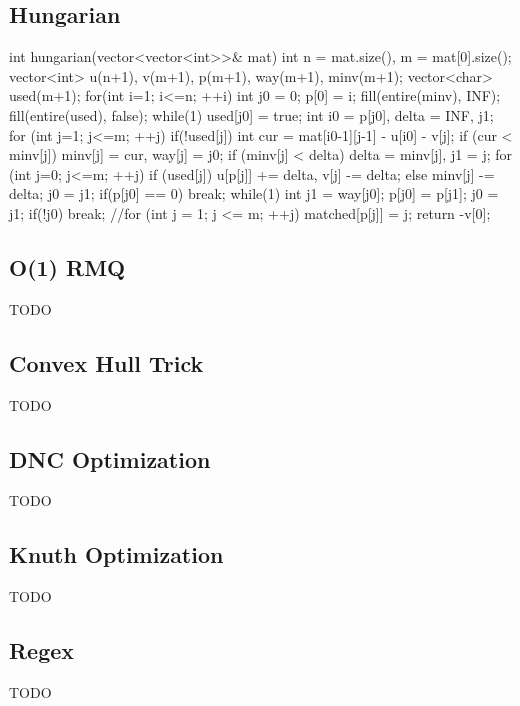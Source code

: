 \subsection{Hungarian}
\begin{cpp}
int hungarian(vector<vector<int>>& mat){
  int n = mat.size(), m = mat[0].size();
  vector<int> u(n+1), v(m+1), p(m+1), way(m+1), minv(m+1);
  vector<char> used(m+1);
  for(int i=1; i<=n; ++i) {
    int j0 = 0; p[0] = i;
    fill(entire(minv), INF);
    fill(entire(used), false);
    while(1){
      used[j0] = true;
      int i0 = p[j0], delta = INF, j1;
      for (int j=1; j<=m; ++j) if(!used[j]) {
        int cur = mat[i0-1][j-1] - u[i0] - v[j];
        if (cur < minv[j]) minv[j] = cur, way[j] = j0;
        if (minv[j] < delta) delta = minv[j], j1 = j;
      }
      for (int j=0; j<=m; ++j) {
        if (used[j]) u[p[j]] += delta, v[j] -= delta;
        else minv[j] -= delta;
      }
      j0 = j1;
      if(p[j0] == 0) break;
    }
    while(1){
      int j1 = way[j0];
      p[j0] = p[j1]; j0 = j1;
      if(!j0) break;
    }
  }
  //for (int j = 1; j <= m; ++j) matched[p[j]] = j;
  return -v[0];
}
\end{cpp}

\subsection{O(1) RMQ}
TODO

\subsection{Convex Hull Trick}
TODO

\subsection{DNC Optimization}
TODO

\subsection{Knuth Optimization}
TODO

\subsection{Regex}
TODO